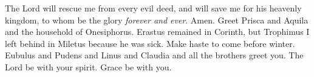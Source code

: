 \begin{biblechapter}
\verse The Lord will rescue me from every evil deed, and will save me for his heavenly kingdom, to whom be the glory \textit{forever and ever}. Amen.
 Greet Prisca and Aquila and the household of Onesiphorus.
\verse Erastus remained in Corinth, but Trophimus I left behind in Miletus because he was sick.
\verse Make haste to come before winter. Eubulus and Pudens and Linus and Claudia and all the brothers greet you.
\verse The Lord be with your spirit. Grace be with you.
\end{biblechapter}

